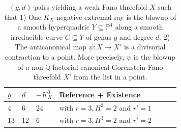 \documentclass[english,11pt,reqno]{amsart}
\newcommand{\sub}{\subseteq}
\newcommand{\Pfour}{\mathbb{P}^4}
\begin{document}
%
%
\vspace{-0.5cm}
\begin{table}[H]
	\caption{$(g,d)$-pairs yielding a weak Fano threefold $X$ such that 1) One $K_X$-negative extremal ray is the blowup of a smooth hyperquadric $Y\sub \Pfour$ along a smooth irreducible curve $C\sub Y$ of genus $g$ and degree $d$. 2) The anticanonical map $\psi:X\rightarrow X'$ is a divisorial contraction to a point. More precisely, $\psi$ is the blowup of a non-$\mathbb{Q}$-factorial canonical Gorenstein Fano threefold $X'$ from the list \cite[A.1]{Weak_Fano_threefolds_I-Jahnke_Peternell_Radloff} in a point.
	}
	\label{table:anticanonical_map_divisorial}
	\begin{minipage}[h]{\textwidth}
		\vspace{5pt}
		\centering
		\begin{tabular}{|l|l|l|l|l|l|l|}
			\hline
			$g$ & $d$ & $-K_X^3$ & Reference + Existence \\
			\hline
			4 & 6 & 24 & \cite[A.4 Nr.\ 25]{Weak_Fano_threefolds_I-Jahnke_Peternell_Radloff} with $r=3, H^3=2$ and $r'=1$ \\
			\hline
			13 & 12 & 6 & \cite[A.4 Nr.\ 25]{Weak_Fano_threefolds_I-Jahnke_Peternell_Radloff} with $r=3, H^3=2$ and $r'=2$ \\
			\hline
\end{tabular}		
\end{minipage}
\end{table}	
%
%
\end{document}
